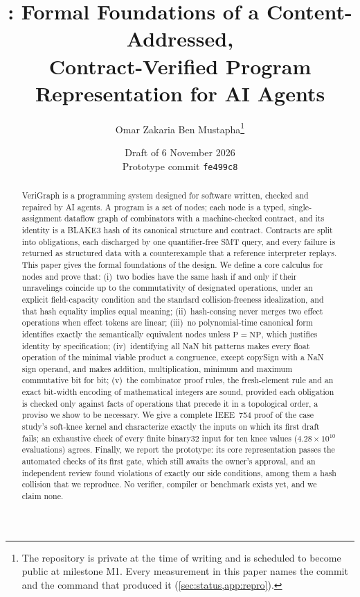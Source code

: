 \documentclass[11pt,a4paper]{article}
\title{\VG: Formal Foundations of a Content-Addressed,\\
  Contract-Verified Program Representation for AI Agents}
\author{Omar Zakaria Ben Mustapha\thanks{The repository is private at the time of writing and is
  scheduled to become public at milestone M1. Every measurement in this paper names the
  commit and the command that produced it (\cref{sec:status,app:repro}).}}
\date{Draft of 6 November 2026 \\[2pt] \small Prototype commit \texttt{fe499c8}}
\theoremstyle{plain}
\theoremstyle{definition}
\theoremstyle{remark}
\newcommand{\VG}{VeriGraph}
\begin{document}
\maketitle

\begin{abstract}
\noindent
\VG{} is a programming system designed for software written, checked and repaired by AI
agents. A program is a set of nodes; each node is a typed, single-assignment dataflow graph of
combinators with a machine-checked contract, and its identity is a BLAKE3 hash of its
canonical structure and contract. Contracts are split into obligations, each discharged by
one quantifier-free SMT query, and every failure is returned as structured data with a
counterexample that a reference interpreter replays. This paper gives the formal
foundations of the design. We define a core calculus for nodes and prove that:
(i)~two bodies have the same hash if and only if their unravelings coincide up to the
commutativity of designated operations, under an explicit field-capacity condition and the
standard collision-freeness idealization, and that hash equality implies equal meaning;
(ii)~hash-consing never merges two effect operations when effect tokens are linear;
(iii)~no polynomial-time canonical form identifies exactly the semantically equivalent nodes
unless $\mathrm{P}=\mathrm{NP}$, which justifies identity by specification;
(iv)~identifying all NaN bit patterns makes every float operation of the minimal viable
product a congruence, except copySign with a NaN sign operand, and makes addition,
multiplication, minimum and maximum commutative bit for bit;
(v)~the combinator proof rules, the fresh-element rule and an exact bit-width encoding of
mathematical integers are sound, provided each obligation is checked only against facts of
operations that precede it in a topological order, a proviso we show to be necessary.
We give a complete IEEE~754 proof of the case study's soft-knee kernel and characterize
exactly the inputs on which its first draft fails; an exhaustive check of every finite
binary32 input for ten knee values ($4.28\times10^{10}$ evaluations) agrees. Finally, we report
the prototype: its core representation passes the automated checks of its first gate, which
still awaits the owner's approval, and an independent review found violations of exactly our
side conditions, among them a hash collision that we reproduce. No verifier, compiler or
benchmark exists yet, and we claim none.
\end{abstract}

\tableofcontents
\bigskip
\end{document}
